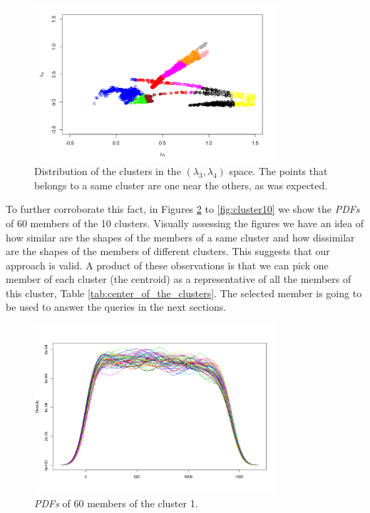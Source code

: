 \begin{figure}[H]
    \centering
    \includegraphics[width=0.8\textwidth]{images/Clusters_lambda3_lambda4.png}
    \caption{Distribution of the clusters in the $(\lambda_{3}, \lambda_{4})$ space. The points that belongs to a same cluster are one near the others, as was expected.}
    \label{fig:clusters_lambda3_lambda4_space}
\end{figure}

To further corroborate this fact, in Figures \ref{fig:cluster1} to \ref{fig:cluster10} we show the \textit{PDFs} of 60 members of the 10 clusters. Visually assessing the figures we have an idea of how similar are the shapes of the members of a same cluster and how dissimilar are the shapes of the  members of different clusters. This suggests that our approach is valid. A product of these observations is that we can pick one member of each cluster (the centroid) as a representative of all the members of this cluster, Table \ref{tab:center_of_the_clusters}. The selected member is going to be used to answer the queries in the next sections.

\begin{figure}[H]
    \centering
    \includegraphics[width=0.8\textwidth]{images/cluster1.png}
    \caption{\textit{PDFs} of 60 members of the cluster 1.}
    \label{fig:cluster1}
\end{figure}

